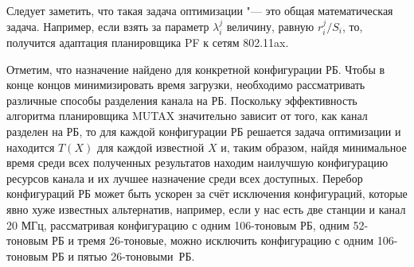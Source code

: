 Следует заметить, что такая задача оптимизации "--- это общая математическая задача. Например, если взять за параметр $\lambda_i^j$ величину, равную $r_i^j / S_i$, то, получится адаптация планировщика PF к сетям 802.11ax.

Отметим, что назначение найдено для конкретной конфигурации РБ. Чтобы в конце концов минимизировать время загрузки, необходимо рассматривать различные способы разделения канала на РБ.
Поскольку эффективность алгоритма планировщика MUTAX значительно зависит от того, как канал разделен на РБ, то для каждой конфигурации РБ решается задача оптимизации и находится $T(X)$ для каждой известной $X$
и, таким образом, найдя минимальное время среди всех полученных результатов находим наилучшую конфигурацию ресурсов канала и их лучшее назначение среди всех доступных. 
Перебор конфигураций РБ может быть ускорен за счёт исключения конфигураций, которые явно хуже известных альтернатив, например, если у нас есть две станции и канал 20 МГц, рассматривая конфигурацию с одним 106-тоновым РБ, одним 52-тоновым РБ и тремя 26-тоновые, можно исключить конфигурацию с одним 106-тоновым РБ и пятью 26-тоновыми~РБ.

\iffalse
Планировщик MaxRate в качестве целевой функции рассматривает суммарную пропускную способность в канале. Данный планировщик рассматривает ресурсные блоки один за другим и присваивает каждому РБ пользователя с наивысшей номинальной скоростью передачи данных $r_{i}^{j}$ в этом РБ.

Планировщик Proportional Fair максимизирует сумму логарифмов пропускной способности станций в заданный момент времени, или, другими словами, их среднее геометрическое. Планирование ресурсов сводится к решению оптимизационной задачи, аналогичной MUTAX, но вместо параметра $\lambda$ брать отношение скорости передачи в ресурсном блоке к количеству переданных данных. Поскольку производительность алгоритма планировщика PF значительно зависит от того, как канал разделен на РБ, то и для его работы находим лучшую конфигурацию РБ перебором.
\fi